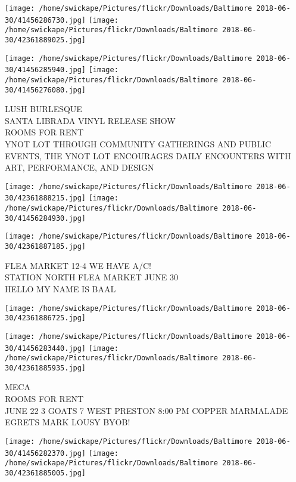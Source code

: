 \documentclass[10pt,letterpaper]{article}
\begin{document}
\texttt{[image: /home/swickape/Pictures/flickr/Downloads/Baltimore 2018-06-30/41456286730.jpg]}
\texttt{[image: /home/swickape/Pictures/flickr/Downloads/Baltimore 2018-06-30/42361889025.jpg]}

\texttt{[image: /home/swickape/Pictures/flickr/Downloads/Baltimore 2018-06-30/41456285940.jpg]}
\texttt{[image: /home/swickape/Pictures/flickr/Downloads/Baltimore 2018-06-30/41456276080.jpg]}

LUSH BURLESQUE\\
SANTA LIBRADA VINYL RELEASE SHOW\\
ROOMS FOR RENT\\
YNOT LOT THROUGH COMMUNITY GATHERINGS AND PUBLIC EVENTS, THE YNOT LOT ENCOURAGES DAILY ENCOUNTERS WITH ART, PERFORMANCE, AND DESIGN\\
\pagebreak

\texttt{[image: /home/swickape/Pictures/flickr/Downloads/Baltimore 2018-06-30/42361888215.jpg]}
\texttt{[image: /home/swickape/Pictures/flickr/Downloads/Baltimore 2018-06-30/41456284930.jpg]}

\texttt{[image: /home/swickape/Pictures/flickr/Downloads/Baltimore 2018-06-30/42361887185.jpg]}

FLEA MARKET 12{-}4 WE HAVE A/C!\\
STATION NORTH FLEA MARKET JUNE 30\\
HELLO MY NAME IS BAAL\\
\pagebreak

\texttt{[image: /home/swickape/Pictures/flickr/Downloads/Baltimore 2018-06-30/42361886725.jpg]}

\vspace{0.25in}
\texttt{[image: /home/swickape/Pictures/flickr/Downloads/Baltimore 2018-06-30/41456283440.jpg]}
\texttt{[image: /home/swickape/Pictures/flickr/Downloads/Baltimore 2018-06-30/42361885935.jpg]}

MECA\\
ROOMS FOR RENT\\
JUNE 22 3 GOATS 7 WEST PRESTON 8:00 PM COPPER MARMALADE EGRETS MARK LOUSY BYOB!\\
\pagebreak

\texttt{[image: /home/swickape/Pictures/flickr/Downloads/Baltimore 2018-06-30/41456282370.jpg]}
\texttt{[image: /home/swickape/Pictures/flickr/Downloads/Baltimore 2018-06-30/42361885005.jpg]}
\end{document}
